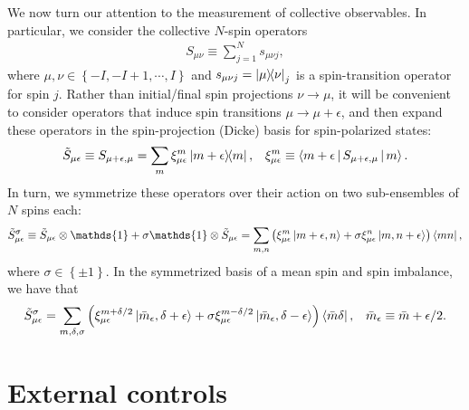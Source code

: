 \documentclass[nofootinbib,notitlepage,11pt]{revtex4-2}
\newcommand{\p}[1]{\left(#1\right)} %
\renewcommand{\set}[1]{\left\{#1\right\}} %
\newcommand{\bk}{\Braket} %
\newcommand{\1}{\mathds{1}}
\begin{document}
We now turn our attention to the measurement of collective observables.
In particular, we consider the collective $N$-spin operators
\begin{align}
  S_{\mu\nu} \equiv \sum_{j=1}^N s_{\mu\nu j},
\end{align}
where $\mu,\nu\in\set{-I,-I+1,\cdots,I}$ and $s_{\mu\nu j} = \op{\mu}{\nu}_j$ is a spin-transition operator for spin $j$.
Rather than initial/final spin projections $\nu\to\mu$, it will be convenient to consider operators that induce spin transitions $\mu\to\mu+\epsilon$, and then expand these operators in the spin-projection (Dicke) basis for spin-polarized states:
\begin{align}
  \tilde S_{\mu\epsilon} \equiv S_{\mu+\epsilon,\mu}
  = \sum_m \xi_{\mu\epsilon}^m \op{m+\epsilon}{m},
  &&
  \xi_{\mu\epsilon}^m \equiv \bk{m+\epsilon|S_{\mu+\epsilon,\mu}|m}.
\end{align}
In turn, we symmetrize these operators over their action on two sub-ensembles of $N$ spins each:
\begin{align}
  \tilde S_{\mu\epsilon}^\sigma \equiv \tilde S_{\mu\epsilon} \otimes \1
  + \sigma \1 \otimes \tilde S_{\mu\epsilon}
  = \sum_{m,n} \p{\xi_{\mu\epsilon}^m \ket{m+\epsilon,n}
    + \sigma \xi_{\mu\epsilon}^n \ket{m,n+\epsilon}} \bra{mn},
\end{align}
where $\sigma\in\set{\pm1}$.
In the symmetrized basis of a mean spin and spin imbalance, we have that
\begin{align}
  \tilde S_{\mu\epsilon}^\sigma
  = \sum_{m,\delta,\sigma} \p{\xi_{\mu\epsilon}^{m+\delta/2}
    \ket{\bar m_\epsilon,\delta+\epsilon}
    + \sigma \xi_{\mu\epsilon}^{m-\delta/2}
    \ket{\bar m_\epsilon,\delta-\epsilon}}
  \bra{\bar m\delta},
  &&
  \bar m_\epsilon \equiv \bar m + \epsilon/2.
\end{align}

\newpage

\newpage
\appendix

\section{External controls}
\label{sec:controls}
\end{document}
